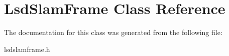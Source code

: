 \hypertarget{class_lsd_slam_frame}{\section{Lsd\-Slam\-Frame Class Reference}
\label{class_lsd_slam_frame}
}


The documentation for this class was generated from the following file\-:\begin{DoxyCompactItemize}
\item 
lsdslamframe.\-h\end{DoxyCompactItemize}
